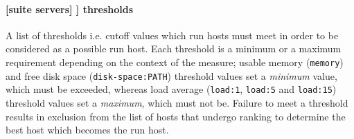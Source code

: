 \paragraph[thresholds]{[suite servers] \textrightarrow [[run host select]] \textrightarrow thresholds}

A list of thresholds i.e. cutoff values which run hosts must meet in order
to be considered as a possible run host. Each threshold is a minimum or a
maximum requirement depending on the context of the measure; usable
memory (\lstinline=memory=) and free disk space
(\lstinline=disk-space:PATH=) threshold values set a {\em minimum} value,
which must be exceeded, whereas load average (\lstinline=load:1=,
\lstinline=load:5= and \lstinline=load:15=) threshold values set a
{\em maximum}, which must not be. Failure to meet a threshold results in
exclusion from the list of hosts that undergo ranking to
determine the best host which becomes the run host.

